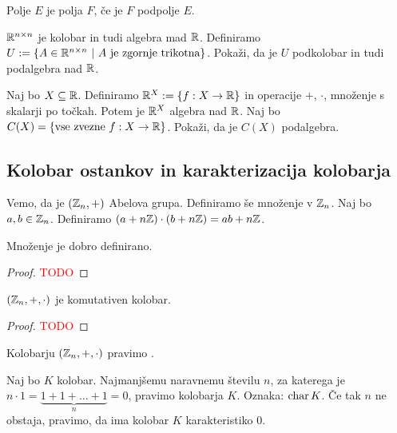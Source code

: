 \begin{definicija}
    Polje $E$ je  polja $F$, če je $F$ podpolje $E$.
\end{definicija}

\begin{primer}
    $\mathbb{R}^{n \times n}$ je kolobar in tudi algebra mad $\mathbb{R}$. Definiramo $U := \left\{A \in \mathbb{R}^{n \times n} \ | \ A \text{ je zgornje trikotna}\right\}$. Pokaži, da je $U$ podkolobar in tudi podalgebra nad $\mathbb{R}$.
\end{primer}

\begin{primer}
    Naj bo $X \subseteq \mathbb{R}$. Definiramo $\mathbb{R}^X := \left\{f: X \to \mathbb{R}\right\}$ in operacije $+$, $\cdot$, množenje s skalarji po točkah. Potem je $\mathbb{R}^X$ algebra nad $\mathbb{R}$. Naj bo $C(X) = \left\{\text{vse zvezne } f: X \to \mathbb{R}\right\}$. Pokaži, da je $C(X)$ podalgebra.
\end{primer}

\subsection{Kolobar ostankov in karakterizacija kolobarja}
Vemo, da je $(\mathbb{Z}_n, +)$ Abelova grupa. Definiramo še množenje v $\mathbb{Z}_n$. Naj bo $a, b \in \mathbb{Z}_n$. Definiramo $(a+n\mathbb{Z}) \cdot (b + n\mathbb{Z}) = ab + n\mathbb{Z}$.

\begin{lema}
    Množenje je dobro definirano.
\end{lema}

\begin{proof}
    \textcolor{red}{TODO}
\end{proof}

\begin{trditev}
    $(\mathbb{Z}_n, +, \cdot)$ je komutativen kolobar.
\end{trditev}

\begin{proof}
    \textcolor{red}{TODO}
\end{proof}

\begin{definicija}
    Kolobarju $(\mathbb{Z}_n, +, \cdot)$ pravimo .
\end{definicija}

\begin{definicija}
    Naj bo $K$ kolobar. Najmanjšemu naravnemu številu $n$, za katerega je $n \cdot 1 = \underbrace{1 + 1 + \ldots + 1}_n = 0$, pravimo  kolobarja $K$. Oznaka: $\operatorname{char} K$. Če tak $n$ ne obstaja, pravimo, da ima kolobar $K$ karakteristiko $0$.
\end{definicija}

